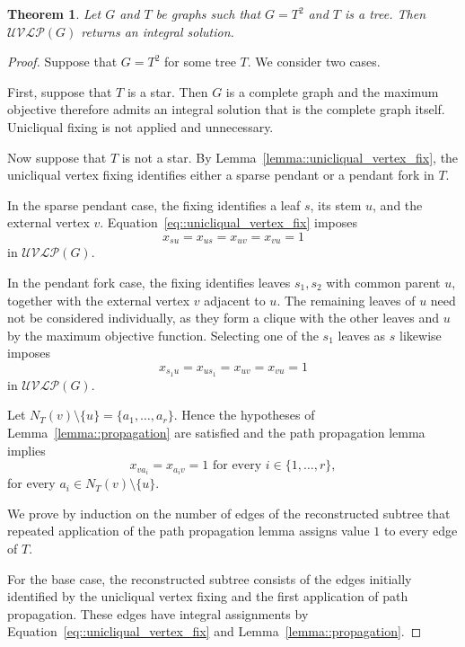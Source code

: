 \documentclass[11pt]{article}
\newtheorem{theorem}{Theorem}
\begin{document}
\begin{theorem} \label{theorem::unicliqual_vertex_induction_proof}
  Let $G$ and $T$ be graphs such that $G=T^2$ and $T$ is a tree. Then $\mathcal{UVLP}(G)$ returns an integral solution.
\end{theorem}
\begin{proof}
  Suppose that $G=T^2$ for some tree $T$. We consider two cases. 
  
  First, suppose that $T$ is a star. Then $G$ is a complete graph and the maximum objective therefore admits an integral solution that is the complete graph itself. Unicliqual fixing is not applied and unnecessary. 

  Now suppose that $T$ is not a star. By Lemma~\ref{lemma::unicliqual_vertex_fix}, the unicliqual vertex fixing identifies either a sparse pendant or a pendant fork in $T$.
  
  In the sparse pendant case, the fixing identifies a leaf $s$, its stem $u$, and the external vertex $v$. Equation~\eqref{eq::unicliqual_vertex_fix} imposes 
  \[ 
  x_{su}=x_{us}=x_{uv}=x_{vu}=1 
  \] 
  in $\mathcal{UVLP}(G)$. 
  
  In the pendant fork case, the fixing identifies leaves $s_1,s_2$ with common parent $u$, together with the external vertex $v$ adjacent to $u$. The remaining leaves of $u$ need not be considered individually, as they form a clique with the other leaves and $u$ by the maximum objective function. Selecting one of the $s_1$ leaves as $s$ likewise imposes 
  \[ 
  x_{s_1u}=x_{us_1}=x_{uv}=x_{vu}=1 
  \] 
  in $\mathcal{UVLP}(G)$. 
  
  Let $N_T(v)\setminus\{u\} = \{a_1,\ldots,a_r\}$. Hence the hypotheses of Lemma~\ref{lemma::propagation} are satisfied and the path propagation lemma implies
  \[
  x_{va_i}=x_{a_iv}=1 \text{ for every } i \in \{1,\ldots,r\},
  \]
  for every $a_i \in N_T(v)\setminus\{u\}$. 

  We prove by induction on the number of edges of the reconstructed subtree that repeated application of the path propagation lemma assigns value $1$ to every edge of $T$. 
    
  For the base case, the reconstructed subtree consists of the edges initially identified by the unicliqual vertex fixing and the first application of path propagation. These edges have integral assignments by Equation~\eqref{eq::unicliqual_vertex_fix} and Lemma~\ref{lemma::propagation}. 
  

\end{proof}
\end{document}
